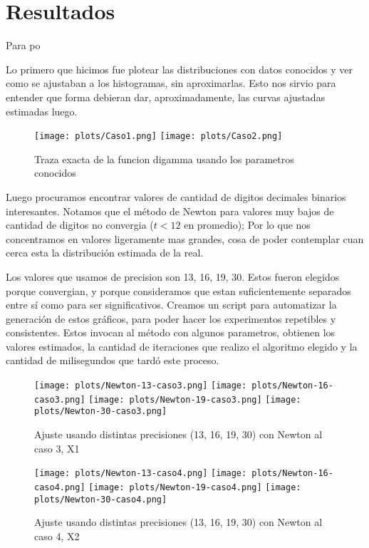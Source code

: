 \section{Resultados}

Para po

Lo primero que hicimos fue plotear las distribuciones con datos conocidos y ver como se ajustaban a los
histogramas, sin aproximarlas. Esto nos sirvio para entender que forma debieran dar, aproximadamente, las curvas
ajustadas estimadas luego.

\begin{figure} [H]
\begin {center}
\texttt{[image: plots/Caso1.png]}
\texttt{[image: plots/Caso2.png]}
\end {center}
\caption{Traza exacta de la funcion digamma usando los parametros conocidos}
\label{fig:FitCaso3Newton}
\end{figure}

Luego procuramos encontrar valores de cantidad de digitos decimales binarios interesantes. Notamos que el m\'etodo de Newton
para valores muy bajos de cantidad de digitos no convergia ($t < 12$ en promedio); Por lo que nos concentramos en valores
ligeramente mas grandes, cosa de poder contemplar cuan cerca esta la distribuci\'on estimada de la real.

Los valores que usamos de precision son 13, 16, 19, 30. Estos fueron elegidos porque convergian, y porque consideramos que estan
suficientemente separados entre s\'i como para ser significativos. Creamos un script para automatizar la generaci\'on de estos gr\'aficos,
para poder hacer los experimentos repetibles y consistentes. Estos invocan al m\'etodo con algunos parametros, obtienen los
valores estimados, la cantidad de iteraciones que realizo el algoritmo elegido y la cantidad de milisegundos que tard\'o este proceso.


\begin{figure} [H]

\texttt{[image: plots/Newton-13-caso3.png]}
\texttt{[image: plots/Newton-16-caso3.png]}
\texttt{[image: plots/Newton-19-caso3.png]}
\texttt{[image: plots/Newton-30-caso3.png]}

\caption{Ajuste usando distintas precisiones (13, 16, 19, 30) con Newton al caso 3, X1}
\label{fig:FitCaso3Newton}
\end{figure}

\begin{figure} [H]

\texttt{[image: plots/Newton-13-caso4.png]}
\texttt{[image: plots/Newton-16-caso4.png]}
\texttt{[image: plots/Newton-19-caso4.png]}
\texttt{[image: plots/Newton-30-caso4.png]}

\caption{Ajuste usando distintas precisiones (13, 16, 19, 30) con Newton al caso 4, X2}
\label{fig:FitCaso4Newton}
\end{figure}


